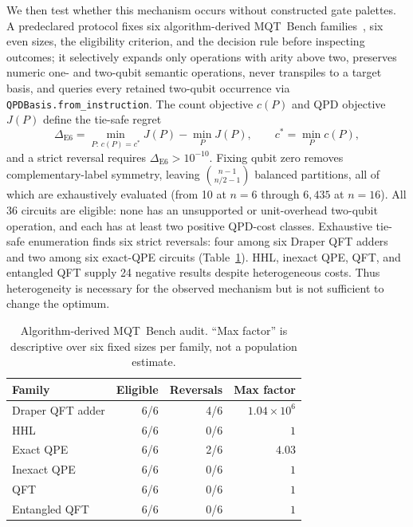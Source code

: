 \documentclass[
  aps,
  pra,
  reprint,
  amsmath,
  amssymb,
  longbibliography,
  nofootinbib,
  floatfix
]{revtex4-2}
\theoremstyle{plain}
\newcommand{\tabfit}[1]{{\footnotesize #1}}
\begin{document}
We then test whether this mechanism occurs without constructed gate palettes. A predeclared protocol fixes six algorithm-derived MQT~Bench families~\cite{mqtbench}, six even sizes, the eligibility criterion, and the decision rule before inspecting outcomes; it selectively expands only operations with arity above two, preserves numeric one- and two-qubit semantic operations, never transpiles to a target basis, and queries every retained two-qubit occurrence via \texttt{QPDBasis.from\_instruction}. The count objective $c(P)$ and QPD objective $J(P)$ define the tie-safe regret
\begin{equation}
  \Delta_{\mathrm{E6}} =
  \min_{P:\,c(P)=c^*} J(P) - \min_P J(P),
  \qquad c^* = \min_P c(P),
  \label{eq:e6-regret}
\end{equation}
and a strict reversal requires $\Delta_{\mathrm{E6}}>10^{-10}$. Fixing qubit zero removes complementary-label symmetry, leaving $\binom{n-1}{n/2-1}$ balanced partitions, all of which are exhaustively evaluated (from 10 at $n=6$ through $6{,}435$ at $n=16$). All 36 circuits are eligible: none has an unsupported or unit-overhead two-qubit operation, and each has at least two positive QPD-cost classes. Exhaustive tie-safe enumeration finds six strict reversals: four among six Draper QFT adders and two among six exact-QPE circuits (Table~\ref{tab:e6-summary}). HHL, inexact QPE, QFT, and entangled QFT supply 24 negative results despite heterogeneous costs. Thus heterogeneity is necessary for the observed mechanism but is not sufficient to change the optimum.

\begin{table}[b]
\centering
\caption{Algorithm-derived MQT~Bench audit. ``Max factor'' is descriptive over six fixed sizes per family, not a population estimate.}
\label{tab:e6-summary}
\tabfit{%
\begin{tabular}{lrrr}
\toprule
\textbf{Family} & \textbf{Eligible} & \textbf{Reversals} & \textbf{Max factor}\\
\midrule
Draper QFT adder & 6/6 & 4/6 & $1.04\times10^6$\\
HHL & 6/6 & 0/6 & $1$\\
Exact QPE & 6/6 & 2/6 & $4.03$\\
Inexact QPE & 6/6 & 0/6 & $1$\\
QFT & 6/6 & 0/6 & $1$\\
Entangled QFT & 6/6 & 0/6 & $1$\\
\bottomrule
\end{tabular}
}
\end{table}
\end{document}
